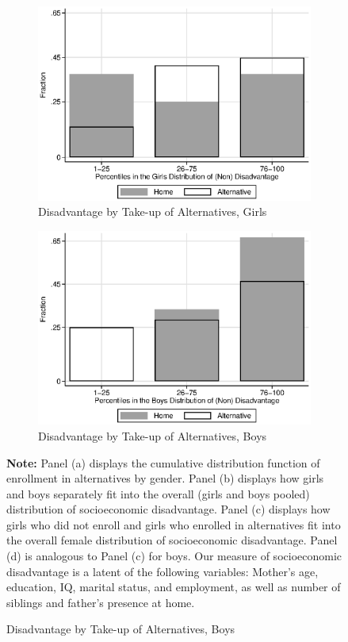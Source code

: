 \begin{figure}
\begin{subfigure}[h]{0.4\textwidth}
	\centering
	\caption{Disadvantage by Take-up of Alternatives, Girls} \label{figure:disadgirls}
	\includegraphics[width=\textwidth]{output/factorbase_wgirlscompare}
\end{subfigure}%
\begin{subfigure}[h]{0.4\textwidth}
	\centering
	\caption{Disadvantage by Take-up of Alternatives, Boys} \label{figure:disadboys}
	\includegraphics[width=\textwidth]{output/factorbase_wboyscompare}
\end{subfigure}
\footnotesize
\justify
\textbf{Note:} Panel (a) displays the cumulative distribution function of enrollment in alternatives by gender. Panel (b) displays how girls and boys separately fit into the overall (girls and boys pooled) distribution of socioeconomic disadvantage. Panel (c) displays how girls who did not enroll and girls who enrolled in alternatives fit into the overall female distribution of socioeconomic disadvantage. Panel (d) is analogous to Panel (c) for boys. Our measure of socioeconomic disadvantage is a latent of the following variables: Mother's age, education, IQ, marital status, and employment, as well as number of siblings and father's presence at home.
\end{figure}

